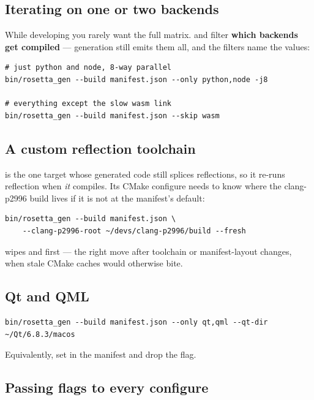 \subsection{Iterating on one or two backends}
\label{sec:onlyskip}

While developing you rarely want the full matrix.  and
 filter \textbf{which backends get compiled} --- generation still
emits them all, and the filters name the  values:

\begin{lstlisting}[style=sh]
# just python and node, 8-way parallel
bin/rosetta_gen --build manifest.json --only python,node -j8

# everything except the slow wasm link
bin/rosetta_gen --build manifest.json --skip wasm
\end{lstlisting}

\subsection{A custom reflection toolchain}

 is the one target whose generated code still splices reflections, so
it re-runs reflection when \emph{it} compiles. Its CMake configure needs to know
where the clang-p2996 build lives if it is not at the manifest's default:

\begin{lstlisting}[style=sh]
bin/rosetta_gen --build manifest.json \
    --clang-p2996-root ~/devs/clang-p2996/build --fresh
\end{lstlisting}

 wipes  and  first --- the right move
after toolchain or manifest-layout changes, when stale CMake caches would
otherwise bite.

\subsection{Qt and QML}

\begin{lstlisting}[style=sh]
bin/rosetta_gen --build manifest.json --only qt,qml --qt-dir ~/Qt/6.8.3/macos
\end{lstlisting}

Equivalently, set  in the manifest and drop the flag.

\subsection{Passing flags to every configure}

